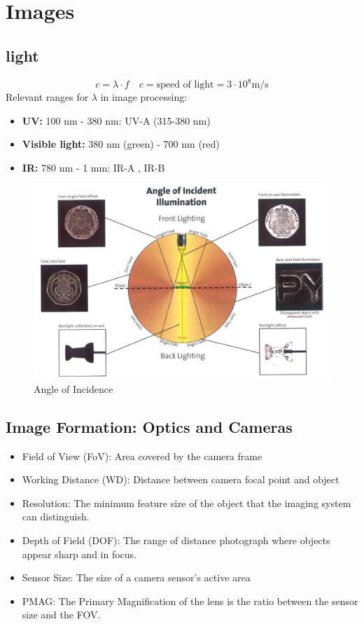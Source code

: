 \section{Images}
\subsection{light}
\[
c = \lambda \cdot f \quad c = \text{speed of light} = 3 \cdot 10^8 \text{m/s}
\]
Relevant ranges for \(\lambda\) in image processing:
\begin{itemize}
    \item \textbf{UV:} 100 nm - 380 nm: UV-A (315-380 nm)
    \item \textbf{Visible light:} 380 nm (green) - 700 nm (red)
    \item \textbf{IR:} 780 nm - 1 mm: IR-A , IR-B 
\end{itemize}
\begin{figure}
    \centering
    \includegraphics[width=0.8\columnwidth]{Images/02/Illumination.png}
    \caption{Angle of Incidence}
    \label{fig:02_Illumination}
\end{figure}
\subsection{Image Formation: Optics and Cameras}
\begin{itemize}
    \item Field of View (FoV): Area covered by the camera frame
    \item Working Distance (WD): Distance between camera focal point and object
    \item Resolution: The minimum feature size of the object that the imaging system can distinguish.
    \item Depth of Field (DOF): The range of distance photograph where objects appear sharp and in focus.
    \item Sensor Size: The size of a camera sensor's active area
    \item PMAG: The Primary Magnification of the lens is the ratio between the sensor size and the FOV.
\end{itemize}

